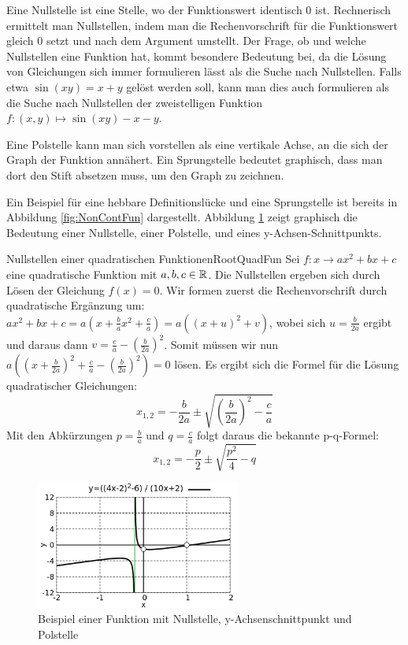 Eine Nullstelle ist eine Stelle, wo der Funktionswert identisch $0$ ist. Rechnerisch ermittelt man Nullstellen, indem man die Rechenvorschrift für die Funktionswert gleich $0$ setzt und nach dem Argument umstellt. Der Frage, ob und welche Nullstellen eine Funktion hat, kommt besondere Bedeutung bei, da die Lösung von Gleichungen sich immer formulieren lässt als die Suche nach Nullstellen. Falls etwa $\sin(xy) = x+y$ gelöst werden soll, kann man dies auch formulieren als die Suche nach Nullstellen der zweistelligen Funktion $f: (x,y) \mapsto \sin(xy)-x-y$.

Eine Polstelle kann man sich vorstellen als eine vertikale Achse, an die sich der Graph der Funktion annähert. Ein Sprungstelle bedeutet graphisch, dass man dort den Stift absetzen muss, um den Graph zu zeichnen.

Ein Beispiel für eine hebbare Definitionslücke und eine Sprungstelle ist bereits in Abbildung \ref{fig:NonContFun} dargestellt. Abbildung \ref{fig:SpecValFun} zeigt graphisch die Bedeutung einer Nullstelle, einer Polstelle, und eines y-Achsen-Schnittpunkts.

\begin{example}{Nullstellen einer quadratischen Funktionen}{RootQuadFun}
    Sei $f: x \to ax^2 + bx +c$ eine quadratische Funktion mit $a,b,c\in\mathbb{R}$. Die Nullstellen ergeben sich durch Lösen der Gleichung $f(x) = 0$. Wir formen zuerst die Rechenvorschrift durch quadratische Ergänzung um: $ax^2 + bx +c = a\left(x + \frac{b}{a}x^2 + \frac{c}{a}\right) = a\left(\left(x+u\right)^2+v\right)$, wobei sich $u=\frac{b}{2a}$ ergibt und daraus dann $v=\frac{c}{a}-\left(\frac{b}{2a}\right)^2$. Somit müssen wir nun $a\left((x+\frac{b}{2a})^2+\frac{c}{a}-\left(\frac{b}{2a}\right)^2\right) = 0$ lösen. Es ergibt sich die Formel für die Lösung quadratischer Gleichungen:
    \begin{equation}
        x_{1,2} = -\frac{b}{2a} \pm \sqrt{\left(\frac{b}{2a}\right)^2 - \frac{c}{a}} \label{eq:RootQuadGen}
    \end{equation}
    Mit den Abkürzungen $p=\frac{b}{a}$ und $q=\frac{c}{a}$ folgt daraus die bekannte p-q-Formel:
    \begin{equation}
        x_{1,2} = -\frac{p}{2} \pm \sqrt{\frac{p^2}{4}-q} \label{eq:RootQuadSpec}
    \end{equation}
\end{example}

\begin{figure}
    \centering
    \includegraphics[width=0.6\textwidth]{./gnuplot/example-special-points}
    \caption{Beispiel einer Funktion mit Nullstelle, y-Achsenschnittpunkt und Polstelle}
    \label{fig:SpecValFun}
\end{figure}

